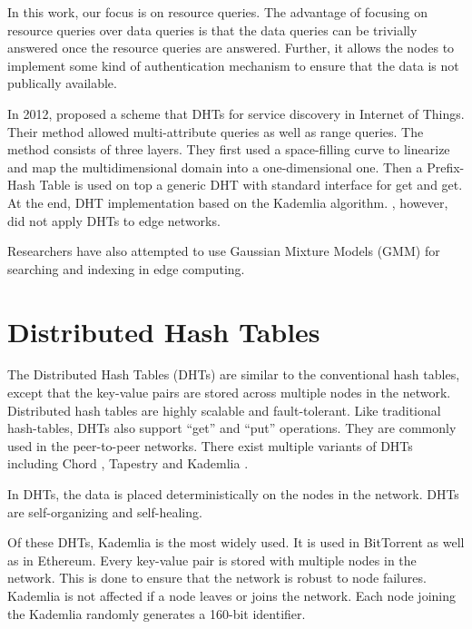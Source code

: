 In this work, our focus is on resource queries. The advantage of focusing on
resource queries over data queries is that the data queries can be trivially
answered once the resource queries are answered. Further, it allows the nodes to
implement some kind of authentication mechanism to ensure that the data is not
publically available.


In 2012, \citet{federicapaganelliDHTBasedDiscoveryService2012} proposed a scheme
that DHTs for service discovery in Internet of Things. Their method allowed
multi-attribute queries as well as range queries. The method consists of three
layers. They first used a space-filling curve to linearize and map the
multidimensional domain into a one-dimensional one. Then a Prefix-Hash Table is
used on top a generic DHT with standard interface for get and get. At the end,
DHT implementation based on the Kademlia algorithm.
\citet{federicapaganelliDHTBasedDiscoveryService2012}, however, did not apply
DHTs to edge networks.

Researchers have also attempted to use Gaussian Mixture Models (GMM) for
searching and indexing in edge computing.


\section{Distributed Hash Tables}

The Distributed Hash Tables (DHTs) are similar to the conventional hash tables,
except that the key-value pairs are stored across multiple nodes in the network.
Distributed hash tables are highly scalable and fault-tolerant. Like traditional
hash-tables, DHTs also support ``get'' and ``put'' operations. They are commonly
used in the peer-to-peer networks. There exist multiple variants of DHTs
including Chord \cite{ChordScalablePeertopeer}, Tapestry
\cite{zhaoTapestryResilientGlobalscale2004} and Kademlia
\cite{petarmaymounkovKademliaPeertoPeerInformation2002}.

In DHTs, the data is placed deterministically on the nodes in the network. DHTs
are self-organizing and self-healing.

Of these DHTs, Kademlia is the most widely used. It is used in BitTorrent
\cite{andrewloewensternDHTProtocol2008} as well as in Ethereum. Every key-value
pair is stored with multiple nodes in the network. This is done to ensure that
the network is robust to node failures. Kademlia is not affected if a node
leaves or joins the network. Each node joining the Kademlia randomly generates a
160-bit identifier.
\cite{petarmaymounkovKademliaPeertoPeerInformation2002}

